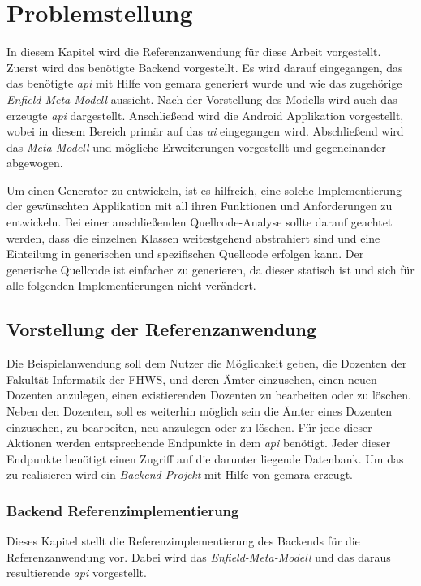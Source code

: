 \chapter{Problemstellung} \label{ch:problem}
In diesem Kapitel wird die Referenzanwendung für diese Arbeit vorgestellt. Zuerst wird das benötigte Backend vorgestellt. Es wird darauf eingegangen, das das benötigte \textit{\acf{api}} mit Hilfe von \acf{gemara} generiert wurde und wie das zugehörige \textit{Enfield-Meta-Modell} aussieht. Nach der Vorstellung des Modells wird auch das erzeugte \textit{\acf{api}} dargestellt. Anschließend wird die Android Applikation vorgestellt, wobei in diesem Bereich primär auf das \textit{\acf{ui}} eingegangen wird. Abschließend wird das \textit{Meta-Modell} und mögliche Erweiterungen vorgestellt und gegeneinander abgewogen.

Um einen Generator zu entwickeln, ist es hilfreich, eine solche Implementierung der gewünschten Applikation mit all ihren Funktionen und Anforderungen zu entwickeln. Bei einer anschließenden Quellcode-Analyse sollte darauf geachtet werden, dass die einzelnen Klassen weitestgehend abstrahiert sind und eine Einteilung in generischen und spezifischen Quellcode erfolgen kann. Der generische Quellcode ist einfacher zu generieren, da dieser statisch ist und sich für alle folgenden Implementierungen nicht verändert. 

\section{Vorstellung der Referenzanwendung}
Die Beispielanwendung soll dem Nutzer die Möglichkeit geben, die Dozenten der Fakultät Informatik der FHWS, und deren Ämter einzusehen, einen neuen Dozenten anzulegen, einen existierenden Dozenten zu bearbeiten oder zu löschen. Neben den Dozenten, soll es weiterhin möglich sein die Ämter eines Dozenten einzusehen, zu bearbeiten, neu anzulegen oder zu löschen. Für jede dieser Aktionen werden entsprechende Endpunkte in dem \textit{\acf{api}} benötigt. Jeder dieser Endpunkte benötigt einen Zugriff auf die darunter liegende Datenbank. Um das zu realisieren wird ein \textit{Backend-Projekt} mit Hilfe von \ac{gemara} erzeugt.

\subsection{Backend Referenzimplementierung}
Dieses Kapitel stellt die Referenzimplementierung des Backends für die Referenzanwendung vor. Dabei wird das \textit{Enfield-Meta-Modell} und das daraus resultierende \textit{\acf{api}} vorgestellt.

